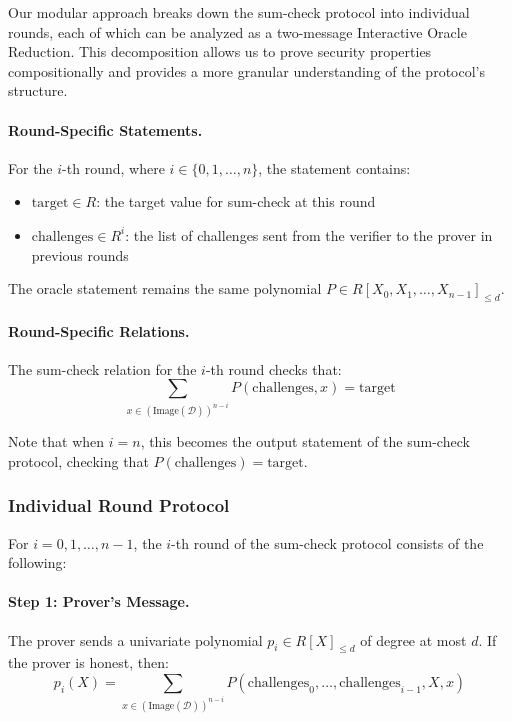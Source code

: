 Our modular approach breaks down the sum-check protocol into individual rounds, each of which can be analyzed as a two-message Interactive Oracle Reduction. This decomposition allows us to prove security properties compositionally and provides a more granular understanding of the protocol's structure.

\paragraph{Round-Specific Statements.} For the $i$-th round, where $i \in \{0, 1, \ldots, n\}$, the statement contains:
\begin{itemize}
    \item $\text{target} \in R$: the target value for sum-check at this round
    \item $\text{challenges} \in R^i$: the list of challenges sent from the verifier to the prover in previous rounds
\end{itemize}

The oracle statement remains the same polynomial $P \in R[X_0, X_1, \ldots, X_{n-1}]_{\leq d}$.

\paragraph{Round-Specific Relations.} The sum-check relation for the $i$-th round checks that:
\[
\sum_{x \in (\text{Image}(\mathcal{D}))^{n-i}} P(\text{challenges}, x) = \text{target}
\]

Note that when $i = n$, this becomes the output statement of the sum-check protocol, checking that $P(\text{challenges}) = \text{target}$.

\subsubsection{Individual Round Protocol}

For $i = 0, 1, \ldots, n-1$, the $i$-th round of the sum-check protocol consists of the following:

\paragraph{Step 1: Prover's Message.} The prover sends a univariate polynomial $p_i \in R[X]_{\leq d}$ of degree at most $d$. If the prover is honest, then:
\[
p_i(X) = \sum_{x \in (\text{Image}(\mathcal{D}))^{n-i}} P(\text{challenges}_0, \ldots, \text{challenges}_{i-1}, X, x)
\]

